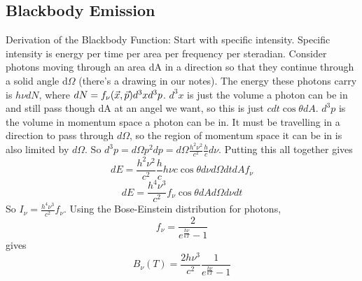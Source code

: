 \subsection{Blackbody Emission}
Derivation of the Blackbody Function:
Start with specific intensity.  Specific intensity is energy per time per area per frequency per 
steradian.  Consider photons moving through an area dA in a direction so that they continue 
through a solid angle d$\Omega$ (there's a drawing in our notes).  The energy these photons carry 
is $h\nu dN$, where $dN=f_{\nu}(\vec{x},\vec{p})d^3xd^3p$.  $d^3x$ is just the volume a photon can be in 
and still pass though dA at an angel we want, so this is just $cdt\cos{\theta}dA$.  $d^3p$ is the 
volume in momentum space a photon can be in.  It must be travelling in a direction to pass through 
$d\Omega$, so the region of momentum space it can be in is also limited by $d\Omega$.  So 
$d^3p=d\Omega p^2dp=d\Omega \frac{h^2\nu^2}{c^2}\frac{h}{c}d\nu$.  Putting this all together gives 
\begin{displaymath}dE=\frac{h^2\nu^2}{c^2}\frac{h}{c}h\nu c\cos{\theta}d\nu d\Omega dtdAf_{\nu}\end{displaymath}
\begin{displaymath}dE=\frac{h^4\nu^3}{c^2}f_{\nu}\cos{\theta}dAd\Omega d\nu dt\end{displaymath}
So $I_{\nu}=\frac{h^4\nu^3}{c^2}f_{\nu}$.
Using the Bose-Einstein distribution for photons, 
\begin{displaymath}f_{\nu}=\frac{2}{e^{\frac{h\nu}{kT}}-1}\end{displaymath}
gives
\begin{displaymath}\boxed{B_{\nu}(T)=\frac{2h\nu^3}{c^2}\frac{1}{e^{\frac{h\nu}{kT}}-1}}\end{displaymath}

